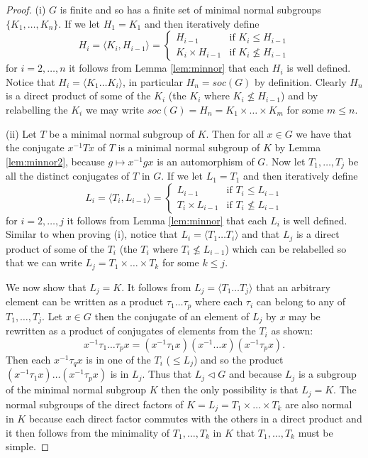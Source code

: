\documentclass[]{article}
\theoremstyle{definition}
\begin{document}
\begin{proof} (i) $G$ is finite and so has a finite set of minimal normal subgroups $\{ K_1, \dots, K_n \}$. If we let $H_1=K_1$ and then iteratively define
$$H_i = \langle K_i, H_{i-1} \rangle =
\left\{
	\begin{array}{ll}
		H_{i-1} & \mbox{if } K_i \leqslant H_{i-1} \\
		K_i \times H_{i-1} & \mbox{if } K_i \nleqslant H_{i-1}
	\end{array}
\right. $$ 
for $i=2, \dots , n$ it follows from Lemma \ref{lem:minnor} that each $H_i$ is well defined. Notice that $H_i = \langle K_1 \dots K_i \rangle$, in particular $H_n = soc(G)$ by definition. Clearly $H_n$ is a direct product of some of the $K_i$ (the $K_i$ where $K_i \nleq H_{i-1}$) and by relabelling the $K_i$ we may write $soc(G) = H_n = K_1 \times \dots \times K_m$ for some $m \leq n$. 

(ii) Let $T$ be a minimal normal subgroup of $K$. Then for all $x \in G$ we have that the conjugate $x^{-1}Tx$ of $T$ is a minimal normal subgroup of $K$ by Lemma \ref{lem:minnor2}, because $g \mapsto x^{-1}gx$ is an automorphism of $G$. Now let $T_1, \dots, T_j$ be all the distinct conjugates of $T$ in $G$. If we let $L_1 = T_1$ and then iteratively define 
$$L_i = \langle T_i, L_{i-1} \rangle =
\left\{
	\begin{array}{ll}
		L_{i-1} & \mbox{if } T_i \leqslant L_{i-1} \\
		T_i \times L_{i-1} & \mbox{if } T_i \nleqslant L_{i-1}
	\end{array}
\right. $$
for $i = 2, \dots, j$ it follows from Lemma \ref{lem:minnor} that each $L_i$ is well defined. Similar to when proving (i), notice that $L_i = \langle T_1 \dots T_i \rangle$ and that $L_j$ is a direct product of some of the $T_i$ (the $T_i$ where $T_i \nleq L_{i-1}$) which can be relabelled so that we can write $L_j = T_1 \times \dots \times T_k$ for some $k \leq j$.

We now show that $L_j = K$. It follows from $L_j = \langle T_1 \dots T_j \rangle$ that an arbitrary element can be written as a product $\tau_1 \dots \tau_p$ where each $\tau_i$ can belong to any of $T_1,\dots,T_j$. Let $x \in G$ then the conjugate of an element of $L_j$ by $x$ may be rewritten as a product of conjugates of elements from the $T_i$ as shown: 
$$x^{-1} \tau_1 \dots \tau_p x = (x^{-1} \tau_1 x) (x^{-1} \dots x) (x^{-1} \tau_p x).$$
Then each $x^{-1} \tau_q x$ is in one of the $T_i$ ($\leqslant L_j$) and so the product $(x^{-1} \tau_1 x) \dots (x^{-1} \tau_p x)$ is in $L_j$. Thus that $L_j \vartriangleleft G$ and because $L_j$ is a subgroup of the minimal normal subgroup $K$ then the only possibility is that $L_j = K$. The normal subgroups of the direct factors of $K = L_j = T_1 \times \dots \times T_k$ are also normal in $K$ because each direct factor commutes with the others in a direct product and it then follows from the minimality of $T_1, \dots , T_k$ in $K$ that $T_1, \dots , T_k$ must be simple.


\end{proof}
\end{document}
